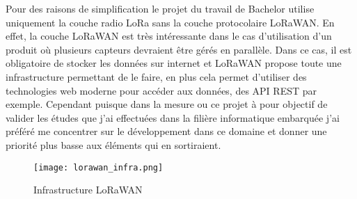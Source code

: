 Pour des raisons de simplification le projet du travail de Bachelor utilise uniquement la couche radio LoRa sans la couche protocolaire LoRaWAN. En effet, la couche LoRaWAN est très intéressante dans le cas d'utilisation d'un produit où plusieurs capteurs devraient être gérés en parallèle. Dans ce cas, il est obligatoire de stocker les données sur internet et LoRaWAN propose toute une infrastructure permettant de le faire, en plus cela permet d'utiliser des technologies web moderne pour accéder aux données, des API REST par exemple. Cependant puisque dans la mesure ou ce projet à pour objectif de valider les études que j'ai effectuées dans la filière informatique embarquée j'ai préféré me concentrer sur le développement dans ce domaine et donner une priorité plus basse aux éléments qui en sortiraient.

\begin{figure}[htb]
\centering 
\texttt{[image: lorawan\_infra.png]} 
\caption{Infrastructure LoRaWAN}
\label{fig:infra_lorawan}
\end{figure}